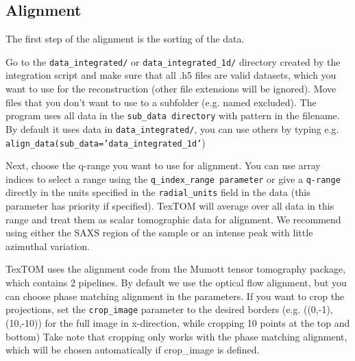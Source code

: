 \subsection{Alignment}
The first step of the alignment is the sorting of the data. 

Go to the \texttt{data\_integrated/} or \texttt{data\_integrated\_1d/} directory created by the integration script
and make sure that all .h5 files are valid datasets, which you 
want to use for the reconstruction (other file extensions will be ignored). 
Move files that you don't want to use to a subfolder (e.g. named excluded).
The program uses all data in the \texttt{sub\_data directory} with pattern in the filename.
By default it uses data in \texttt{data\_integrated/}, you can use others by typing e.g. \texttt{align\_data(sub\_data='data\_integrated\_1d'})

Next, choose the q-range you want to use for alignment. You can use array indices to select a range
using the \texttt{q\_index\_range parameter} or give a \texttt{q-range} directly in the units specified in the \texttt{radial\_units}
field in the data (this parameter has priority if specified). TexTOM will average over all data in this range 
and treat them as scalar tomographic data for alignment. We recommend using either the SAXS region of 
the sample or an intense peak with little azimuthal variation.

TexTOM uses the alignment code from the Mumott tensor tomography package, which contains 2 pipelines.
By default we use the optical flow alignment, but you can choose phase matching alignment in the parameters.
If you want to crop the projections, set the \texttt{crop\_image} parameter to the desired borders (e.g. ((0,-1),(10,-10))
for the full image in x-direction, while cropping 10 points at the top and bottom)
Take note that cropping only works with the phase matching alignment, which will be chosen automatically if 
crop\_image is defined.

